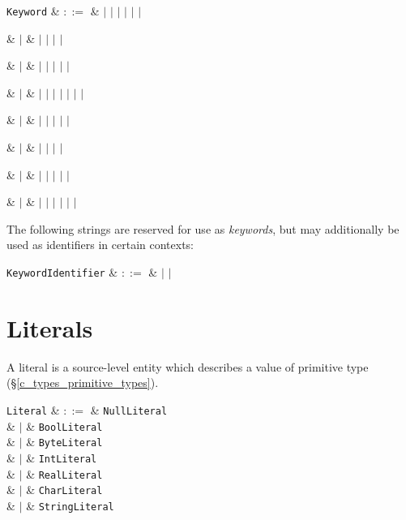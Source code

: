 \begin{syntax}
\verb+Keyword+ & $::=$ &  $|$  $|$
 $|$  $|$  $|$ 
$|$ \\

{\huge\strut} & $|$ &  $|$  $|$  $|$  $|$ \\
{\huge\strut} & $|$ &  $|$  $|$  $|$  $|$  $|$ \\
{\huge\strut} & $|$ &  $|$  $|$  $|$  $|$  $|$  $|$  $|$ \\
{\huge\strut} & $|$ &  $|$  $|$  $|$  $|$  $|$ \\
{\huge\strut} & $|$ &   $|$  $|$  $|$  $|$ \\
{\huge\strut} & $|$ &  $|$  $|$  $|$  $|$  $|$ \\
{\huge\strut} & $|$ &  $|$  $|$  $|$  $|$  $|$  $|$ \\
\end{syntax}

\pagebreak

The following strings are reserved for use as {\em keywords}, but may additionally be used as identifiers in certain contexts:
\begin{syntax}
\verb+KeywordIdentifier+ & $::=$ &  $|$  $|$ \\
\end{syntax}



\section{Literals}

A \gls{literal} is a source-level entity which describes a value of primitive type (\S\ref{c_types_primitive_types}).

\begin{syntax}
\verb+Literal+ & $::=$ &  \verb+NullLiteral+ \\
  & $|$ & \verb+BoolLiteral+ \\
  & $|$ & \verb+ByteLiteral+ \\
  & $|$ & \verb+IntLiteral+ \\
  & $|$ & \verb+RealLiteral+ \\
  & $|$ & \verb+CharLiteral+ \\
  & $|$ & \verb+StringLiteral+ \\
\\
\end{syntax}


